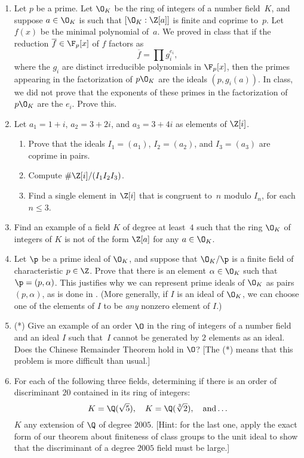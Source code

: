\begin{enumerate}


\item Let $p$ be a prime.  Let $\O_K$ be the ring of integers of a
  number field~$K$, and suppose $a\in \O_K$ is such that
  $[\O_K:\Z[a]]$ is finite and coprime to~$p$.  Let $f(x)$ be the
  minimal polynomial of~$a$.  We proved in class 
that if the reduction $\overline{f}\in\F_p[x]$ of $f$ factors
as 
$$
 \overline{f} = \prod g_i^{e_i},
$$
where the $g_i$ are distinct irreducible polynomials in $\F_p[x]$, then the primes appearing
in the factorization of $p\O_K$ are the ideals $(p,g_i(a))$.
In class, we did not prove that the exponents of these primes in the factorization
of $p\O_K$ are the $e_i$.  Prove this.

\item Let $a_1 = 1+i$, $a_2 = 3+2i$, and $a_3 = 3+4i$ as elements of 
$\Z[i]$. 
\begin{enumerate}
\item Prove that the ideals $I_1=(a_1)$, $I_2=(a_2)$, and $I_3=(a_3)$
are coprime in pairs.
\item Compute $\#\Z[i]/(I_1 I_2 I_3)$.
\item Find a single element in $\Z[i]$ that is congruent to~$n$ modulo $I_n$, 
for each $n\leq 3$.
\end{enumerate}

\item Find an example of a field $K$ of degree at least~$4$ such that the ring
  $\O_K$ of integers of $K$ is not of the form $\Z[a]$ for any $a\in \O_K$.

\item Let $\p$ be a prime ideal of $\O_K$, and suppose that $\O_K/\p$
  is a finite field of characteristic $p\in\Z$.  Prove that there is
  an element $\alpha\in\O_K$ such that $\p=(p,\alpha)$.  This
  justifies why we can represent prime ideals of $\O_K$ as pairs
  $(p,\alpha)$, as is done in \sage.  (More generally, if $I$ is an
  ideal of $\O_K$, we can choose one of the elements of $I$ to be {\em
    any} nonzero element of $I$.)

\item (*) Give an example of an order $\O$ in the ring of integers of
  a number field and an ideal $I$ such that~$I$ cannot be generated by
  $2$ elements as an ideal.  Does the Chinese Remainder Theorem hold
  in $\O$?  [The (*) means that this problem is more difficult than
  usual.]


\item For each of the following three fields, determining if there is
  an order of discriminant $20$ contained in its ring of integers:
$$
  K = \Q(\sqrt{5}), \quad K=\Q(\sqrt[3]{2}), \quad\text{and}\ldots
$$
$K$ any extension of $\Q$ of degree $2005$.  [Hint: for the last one,
apply the exact form of our theorem about finiteness of class groups
to the unit ideal to show that the discriminant of a degree $2005$
field must be large.]


\end{enumerate}

